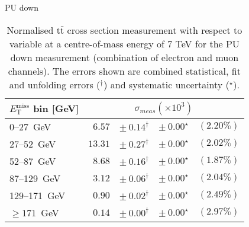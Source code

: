 \documentclass{article}
\newcommand{\ttbar}{\ensuremath{\text{t}\bar{\text{t}}}\xspace}
\newcommand{\GeV}{GeV}
\begin{document}
PU down
\begin{table}[htbp]
\setlength{\tabcolsep}{2pt}
\centering
\caption{Normalised \ttbar cross section measurement with respect to \MET variable
at a centre-of-mass energy of 7 TeV for the PU down measurement (combination of electron and muon
channels). The errors shown are combined statistical, fit and unfolding errors ($^\dagger$) and systematic uncertainty ($^\star$).}
\label{tab:MET_xsections_7TeV__PU_down_combined}
\begin{tabular}{lrrrr}
\hline
$E_{\mathrm{T}}^{\mathrm{miss}}$ bin [\GeV] & \multicolumn{4}{c}{$\sigma_{meas} \left(\times 10^{3}\right)$}\\ 
\hline
0--27~\GeV &  $6.57$ & $ \pm~ 0.14^\dagger$ & $ \pm~ 0.00^\star$ & $(2.20\%)$\\ 
27--52~\GeV &  $13.31$ & $ \pm~ 0.27^\dagger$ & $ \pm~ 0.00^\star$ & $(2.02\%)$\\ 
52--87~\GeV &  $8.68$ & $ \pm~ 0.16^\dagger$ & $ \pm~ 0.00^\star$ & $(1.87\%)$\\ 
87--129~\GeV &  $3.12$ & $ \pm~ 0.06^\dagger$ & $ \pm~ 0.00^\star$ & $(2.04\%)$\\ 
129--171~\GeV &  $0.90$ & $ \pm~ 0.02^\dagger$ & $ \pm~ 0.00^\star$ & $(2.49\%)$\\ 
$\geq 171$~\GeV &  $0.14$ & $ \pm~ 0.00^\dagger$ & $ \pm~ 0.00^\star$ & $(2.97\%)$\\ 
\hline 
\end{tabular}
\end{table}
\end{document}
